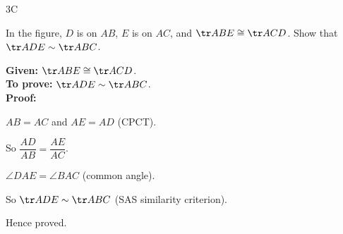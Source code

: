 \begin{exercise}{3C}
\item In the figure, $D$ is on $AB$, $E$ is on $AC$, and $\tr ABE\cong\tr ACD$. Show that $\tr ADE\sim\tr ABC$.
\begin{solution}
\textbf{Given:} $\tr ABE\cong\tr ACD$.\\
\textbf{To prove:} $\tr ADE\sim\tr ABC$.\\
\textbf{Proof:}
\begin{steps}
  \item $AB=AC$ and $AE=AD$ (CPCT).
  \item So $\dfrac{AD}{AB}=\dfrac{AE}{AC}$.
  \item $\angle DAE=\angle BAC$ (common angle).
  \item So $\tr ADE\sim\tr ABC$ (SAS similarity criterion).
\end{steps}
Hence proved.
\end{solution}


\end{exercise}
